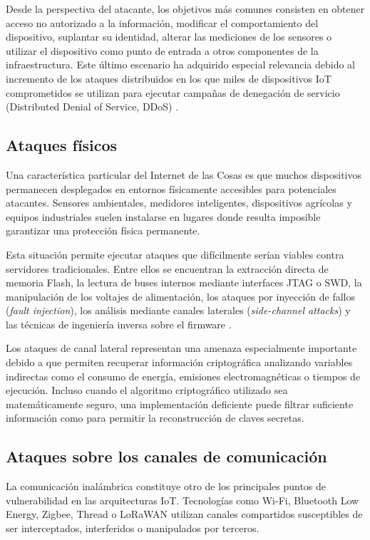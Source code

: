 Desde la perspectiva del atacante, los objetivos más comunes consisten en obtener acceso no autorizado a la información, modificar el comportamiento del dispositivo, suplantar su identidad, alterar las mediciones de los sensores o utilizar el dispositivo como punto de entrada a otros componentes de la infraestructura. Este último escenario ha adquirido especial relevancia debido al incremento de los ataques distribuidos en los que miles de dispositivos IoT comprometidos se utilizan para ejecutar campañas de denegación de servicio (Distributed Denial of Service, DDoS) \cite{Klimushyn2022Crypto-ResistantDevices}.

\subsection{Ataques físicos}

Una característica particular del Internet de las Cosas es que muchos dispositivos permanecen desplegados en entornos físicamente accesibles para potenciales atacantes. Sensores ambientales, medidores inteligentes, dispositivos agrícolas y equipos industriales suelen instalarse en lugares donde resulta imposible garantizar una protección física permanente.

Esta situación permite ejecutar ataques que difícilmente serían viables contra servidores tradicionales. Entre ellos se encuentran la extracción directa de memoria Flash, la lectura de buses internos mediante interfaces JTAG o SWD, la manipulación de los voltajes de alimentación, los ataques por inyección de fallos (\textit{fault injection}), los análisis mediante canales laterales (\textit{side-channel attacks}) y las técnicas de ingeniería inversa sobre el firmware \cite{Klimushyn2022Crypto-ResistantDevices}.

Los ataques de canal lateral representan una amenaza especialmente importante debido a que permiten recuperar información criptográfica analizando variables indirectas como el consumo de energía, emisiones electromagnéticas o tiempos de ejecución. Incluso cuando el algoritmo criptográfico utilizado sea matemáticamente seguro, una implementación deficiente puede filtrar suficiente información como para permitir la reconstrucción de claves secretas.

\subsection{Ataques sobre los canales de comunicación}

La comunicación inalámbrica constituye otro de los principales puntos de vulnerabilidad en las arquitecturas IoT. Tecnologías como Wi-Fi, Bluetooth Low Energy, Zigbee, Thread o LoRaWAN utilizan canales compartidos susceptibles de ser interceptados, interferidos o manipulados por terceros.

